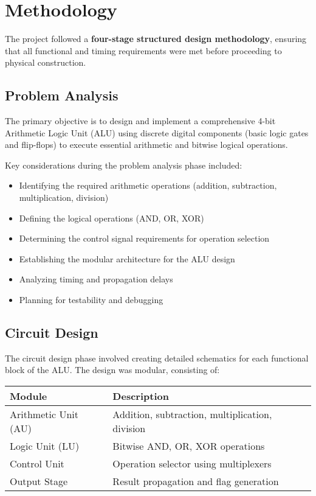 \chapter{Methodology}

The project followed a \textbf{four-stage structured design methodology}, ensuring that all functional and timing requirements were met before proceeding to physical construction.

\section{Problem Analysis}

The primary objective is to design and implement a comprehensive 4-bit Arithmetic Logic Unit (ALU) using discrete digital components (basic logic gates and flip-flops) to execute essential arithmetic and bitwise logical operations.

Key considerations during the problem analysis phase included:
\begin{itemize}
    \item Identifying the required arithmetic operations (addition, subtraction, multiplication, division)
    \item Defining the logical operations (AND, OR, XOR)
    \item Determining the control signal requirements for operation selection
    \item Establishing the modular architecture for the ALU design
    \item Analyzing timing and propagation delays
    \item Planning for testability and debugging
\end{itemize}

\section{Circuit Design}

The circuit design phase involved creating detailed schematics for each functional block of the ALU. The design was modular, consisting of:

\begin{table}
\centering
\begin{tabular}{ll}
\toprule
\textbf{Module} & \textbf{Description} \\
\midrule
Arithmetic Unit (AU) & Addition, subtraction, multiplication, division \\
Logic Unit (LU) & Bitwise AND, OR, XOR operations \\
Control Unit & Operation selector using multiplexers \\
Output Stage & Result propagation and flag generation \\
\bottomrule
\end{tabular}
\label{tab:alu-blocks}
\end{table}

